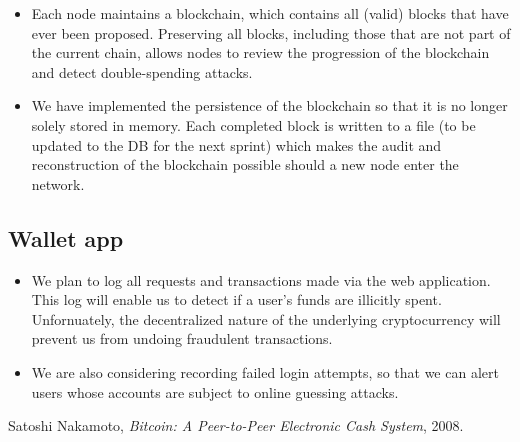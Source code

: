 \documentclass[a4paper,12pt]{article}
\begin{document}
\begin{itemize}
\item Each node maintains a blockchain, which contains all (valid) blocks that have ever been proposed. Preserving all blocks, including those that are not part of the current chain, allows nodes to review the progression of the blockchain and detect double-spending attacks.
\begin{comment}
\item Miners heavily audit the work of other miners in order to maintain the integrity of the blockchain.
\item For each block a miner receives (or broadcasts), its hash will be checked to see if it satisfies a set difficulty. 
\item Every transaction inside of the block is verified by checking that each input has a corresponding unspent output (UTXO), that the signature for each input was signed with the private key corresponding to the public key on the previous UTXO, and that the sum of the input amounts (from the UTXO's) is equal to the sum of the outputs.
\item If either of these checks fail, the potential new block will be rejected.
\item So long as an adversary does not control a majority of nodes in the network, blocks will not be added to the blockchain that are not correct.
\end{comment}
\item We have implemented the persistence of the blockchain so that it is no longer solely stored in memory. Each completed block is written to a file (to be updated to the DB for the next sprint) which makes the audit and reconstruction of the blockchain possible should a new node enter the network.
\end{itemize}

\subsection{Wallet app}

\begin{itemize}
  \item We plan to log all requests and transactions made via the web application. This log will enable us to detect if a user's funds are illicitly spent. Unfornuately, the decentralized nature of the underlying cryptocurrency will prevent us from undoing fraudulent transactions.
  \item We are also considering recording failed login attempts, so that we can alert users whose accounts are subject to online guessing attacks.
\end{itemize}


\begin{thebibliography}{9}
  Satoshi Nakamoto,
  \emph{Bitcoin: A Peer-to-Peer Electronic Cash System},
  2008.
\end{thebibliography}
\end{document}
